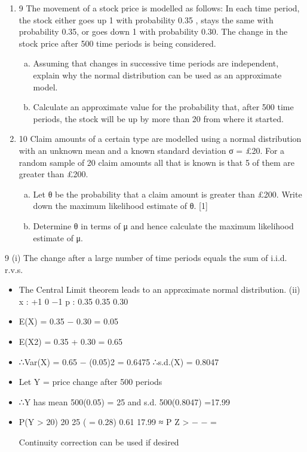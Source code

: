 \documentclass[a4paper,12pt]{article}
\begin{document}
\begin{enumerate}

\item 9 The movement of a stock price is modelled as follows:
In each time period, the stock either goes up 1 with probability 0.35 , stays the
same with probability 0.35, or goes down 1 with probability 0.30.
The change in the stock price after 500 time periods is being considered.
\begin{enumerate}[(a)]
\item Assuming that changes in successive time periods are independent,
explain why the normal distribution can be used as an approximate
model. 
\item  Calculate an approximate value for the probability that, after 500 time periods, the stock will be up by more than 20 from where it started. 
\end{enumerate}
\item 10 Claim amounts of a certain type are modelled using a normal distribution with an unknown mean and a known standard deviation σ = £20.
For a random sample of 20 claim amounts all that is known is that 5 of them are
greater than £200.
\begin{enumerate}[(a)]
\item  Let θ be the probability that a claim amount is greater than £200. Write
down the maximum likelihood estimate of θ. [1]
\item Determine θ in terms of μ and hence calculate the maximum likelihood
estimate of μ. 
\end{enumerate}

\end{enumerate}
9 (i) The change after a large number of time periods equals the sum of i.i.d.
r.v.s.

\begin{itemize}
    \item The Central Limit theorem leads to an approximate normal distribution.
(ii)
x : +1 0 −1
p : 0.35 0.35 0.30
\item E(X) = 0.35 − 0.30 = 0.05
\item E(X2) = 0.35 + 0.30 = 0.65
\item ∴Var(X) = 0.65 − (0.05)2 = 0.6475 ∴s.d.(X) = 0.8047
\item Let Y = price change after 500 periods
\item ∴Y has mean 500(0.05) = 25 and s.d. 500(0.8047) =17.99
\item P(Y > 20)
20 25
( = 0.28) 0.61
17.99
≈ P Z > − − =
\item [Continuity correction can be used if desired]
\end{itemize}
\end{document}
